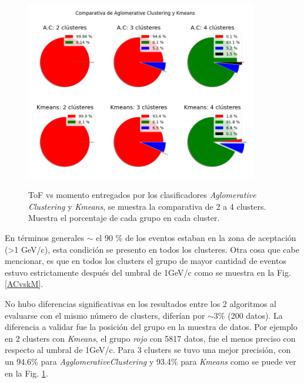 \begin{figure}[h!]
\begin{center}
\caption{ToF vs momento entregados por los clasificadores \textit{Aglomerative Clustering} y \textit{Kmeans}, se muestra la comparativa de 2 a 4 clusters. Muestra el porcentaje de cada grupo en cada cluster.}
\includegraphics[width=0.9\textwidth]{Figures/imagenes/tor.png}
\label{ACvskM1}
\end{center}
\end{figure}

En términos generales $\sim$ el 90 $\%$ de los eventos estaban en la zona de aceptación (>1 GeV/c), esta condición se presento en todos los clusteres. Otra cosa que cabe mencionar, es que en todos los clusters el grupo de mayor cantidad de eventos estuvo estrictamente después del umbral de 1GeV/c como se muestra en la Fig. \ref{ACvskM}. 



No hubo diferencias significativas en los resultados entre los 2 algoritmos al evaluarse con el mismo número de clusters, diferían por  $\sim$3\% (200 datos). La diferencia a validar fue la posición del grupo en la muestra de datos. Por ejemplo en 2 clusters con \textit{Kmeans}, el grupo \textit{rojo} con 5817 datos, fue el menos preciso con respecto al umbral de 1GeV/c. Para 3 clusters se tuvo una mejor precisión, con un 94.6\% para \textit{AgglomerativeClustering} y 93.4\% para \textit{Kmeans} como se puede ver en la Fig. \ref{ACvskM1}.

